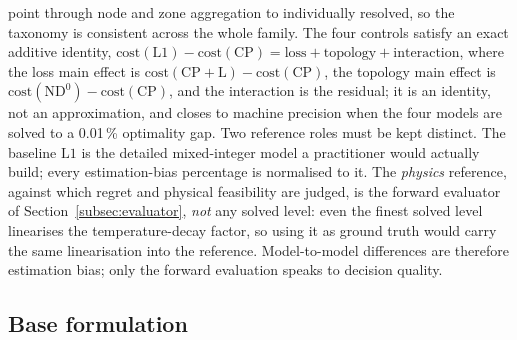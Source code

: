 \documentclass[a4paper,fleqn]{cas-dc}
\newcommand{\CP}{\ensuremath{\mathrm{CP}}}      %
\newcommand{\CPL}{\ensuremath{\mathrm{CP{+}L}}} %
\newcommand{\NDz}{\ensuremath{\mathrm{ND^{0}}}} %
\newcommand{\Lone}{\ensuremath{\mathrm{L1}}}    %
\begin{document}
point through node and zone aggregation to individually resolved, so the taxonomy is consistent
across the whole family. The four controls satisfy an exact additive identity,
$\text{cost}(\Lone)-\text{cost}(\CP)=\text{loss}+\text{topology}+\text{interaction}$, where the
loss main effect is $\text{cost}(\CPL)-\text{cost}(\CP)$, the topology main effect is
$\text{cost}(\NDz)-\text{cost}(\CP)$, and the interaction is the residual; it is an identity,
not an approximation, and closes to machine precision when the four models are solved to a
0.01\,\% optimality gap.
Two reference roles must be kept distinct. The baseline $\Lone$ is the detailed
mixed-integer model a practitioner would actually build; every estimation-bias percentage is
normalised to it. The \emph{physics} reference, against which regret and physical feasibility
are judged, is the forward evaluator of Section~\ref{subsec:evaluator}, \emph{not} any solved
level: even the finest solved level linearises the temperature-decay factor, so using it as
ground truth would carry the same linearisation into the reference. Model-to-model differences
are therefore estimation bias; only the forward evaluation speaks to decision quality.

\subsection{Base formulation}
\end{document}
